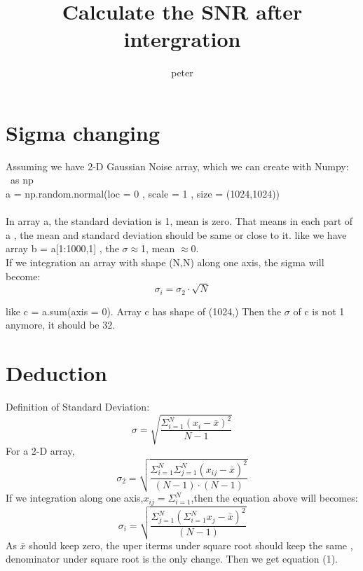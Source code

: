 \documentclass{article}
\title{Calculate the SNR after intergration}
\begin{document}
\author{peter}

\maketitle
\section{Sigma changing}
Assuming we have 2-D Gaussian Noise array, which we can create with Numpy:\\
\ as np\\
a = np.random.normal(loc = 0 , scale = 1 , size = (1024,1024))\\
\\In array a, the standard deviation is 1, mean is zero. That means in each part of a , the mean and standard deviation should be same or close to it. like we have array b  = a[1:1000,1] , the $\sigma\approx$1,  mean $\approx$0.\\
If we integration an array with shape (N,N) along one axis, the sigma will become:
\begin{equation}
\sigma_i= \sigma_2 \cdot \sqrt{N}
\end{equation}

like c = a.sum(axis = 0). Array c has shape of (1024,) Then the $\sigma$ of c is not 1 anymore, it should be 32.\\

\section{Deduction}
Definition of Standard Deviation:
\begin{equation}
\sigma = \sqrt{\frac{\Sigma_{i=1}^N(x_i-\bar{x})^2}{N-1}}
\end{equation}
For a 2-D array, 
\begin{equation}
\sigma_2= \sqrt{\frac{\Sigma_{i=1}^N\Sigma_{j=1}^N(x_{ij}-\bar{x})^2}{(N-1)\cdot(N-1)}}
\end{equation}
If we integration along one axis,$x_{ij}=\Sigma_{i=1}^N$,then the equation above will becomes:
\begin{equation}
\sigma_i= \sqrt{\frac{\Sigma_{j=1}^N(\Sigma_{i=1}^Nx_{j}-\bar{x})^2}{(N-1)}}
\end{equation}
As $\bar{x}$ should keep zero, the uper iterms under square root should keep the same , denominator under square root is the only change.
Then we get equation (1).
\end{document}
